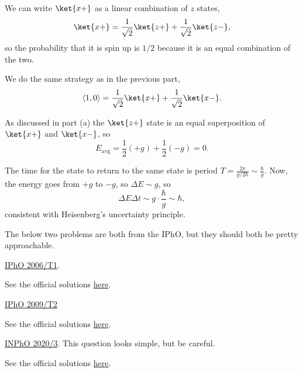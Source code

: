 \documentclass[11pt]{scrartcl}
\newcommand{\officialsol}[1]{See the official solutions \href{#1}{here}.}
\begin{document}
\begin{alphasol}
    \item We can write $\ket{x+}$ as a linear combination of $z$ states,
    $$\ket{x+} = \frac{1}{\sqrt 2} \ket{z+} + \frac{1}{\sqrt 2}\ket{z-},$$
    so the probability that it is spin up is $\boxed{1/2}$ because it is an equal combination of the two.
    \item We do the same strategy as in the previous part,
    $$\langle 1,0\rangle = \frac{1}{\sqrt 2}\ket{x+} + \frac{1}{\sqrt 2}\ket{x-}.$$
    \item As discussed in part (a) the $\ket{z+}$ state is an equal superposition of $\ket{x+}$ and $\ket{x-}$, so
    $$E_{\text{avg}} = \frac 12 (+g) + \frac 12 (-g) = 0.$$
    \item The time for the state to return to the same state is  period $T = \frac{2\pi}{g/2\hbar} \sim \frac{\hbar}{g}$. Now, the energy goes from $+g$ to $-g$, so $\Delta E \sim g$, so $$\Delta E \Delta t \sim g \cdot \frac{\hbar}{g} \sim \hbar,$$
    consistent with Heisenberg's uncertainty principle.
\end{alphasol}


The below two problems are both from the IPhO, but they should both be pretty approachable.

\begin{prob}
    \href{https://ipho.olimpicos.net/pdf/IPhO_2006_Q1.pdf}{IPhO 2006/T1}. 
\end{prob}
\begin{sol}
    \officialsol{https://ipho.olimpicos.net/pdf/IPhO_2006_S1.pdf}
\end{sol}

\begin{prob}
    \href{https://ipho.olimpicos.net/pdf/IPhO_2009_Q2.pdf}{IPhO 2009/T2}
\end{prob}
\begin{sol}
    \officialsol{https://ipho.olimpicos.net/pdf/IPhO_2009_S2.pdf}
\end{sol}

\begin{prob}
    \href{https://olympiads.hbcse.tifr.res.in/wp-content/uploads/2020/02/INPHO2020-Questions-en.pdf}{INPhO 2020/3}. This question looks simple, but be careful.
\end{prob}
\begin{sol}
    \officialsol{https://olympiads.hbcse.tifr.res.in/wp-content/uploads/2020/03/INPHO2020-Solutions-20200220.pdf}
\end{sol}
\end{document}
